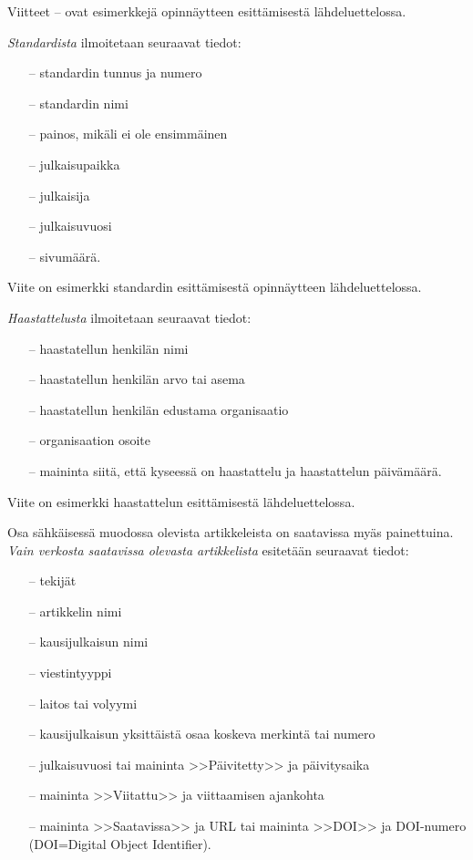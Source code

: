 \documentclass[english,12pt,a4paper,pdftex]{article}
\begin{document}
Viitteet \cite{Miinusmaa}--\cite{Lonnqvist} ovat esimerkkejä
opinnäytteen esittämisestä lähdeluettelossa.

\textit{Standardista} ilmoitetaan seuraavat tiedot:

\begin{itemize}
\item[--]standardin tunnus ja numero
\item[--]standardin nimi
\item[--]painos, mikäli ei ole ensimmäinen
\item[--]julkaisupaikka
\item[--]julkaisija
\item[--]julkaisuvuosi
\item[--]sivumäärä.
\end{itemize}
Viite \cite{sfs} on esimerkki standardin esittämisestä opinnäytteen
lähdeluettelossa.

\textit{Haastattelusta} ilmoitetaan seuraavat tiedot:

\begin{itemize}
\item[--]haastatellun henkilän nimi
\item[--]haastatellun henkilän arvo tai asema
\item[--]haastatellun henkilän edustama organisaatio
\item[--]organisaation osoite
\item[--]maininta siitä, että kyseessä on haastattelu ja haastattelun
päivämäärä.
\end{itemize}

Viite \cite{haastattelu} on esimerkki
haastattelun esittämisestä lähdeluettelossa.

Osa sähkäisessä muodossa olevista artikkeleista on saatavissa myäs
painettuina. \textit{Vain verkosta saatavissa olevasta artikkelista} esitetään
seuraavat tiedot:

\begin{itemize}
\item[--]tekijät
\item[--]artikkelin nimi
\item[--]kausijulkaisun nimi
\item[--]viestintyyppi
\item[--]laitos tai volyymi
\item[--]kausijulkaisun yksittäistä osaa koskeva merkintä tai numero
\item[--]julkaisuvuosi tai maininta >>Päivitetty>> ja päivitysaika
\item[--]maininta >>Viitattu>> ja viittaamisen ajankohta
\item[--]maininta >>Saatavissa>> ja URL tai
        maininta >>DOI>> ja DOI-numero (DOI=Digital Object Identifier).
\end{itemize}
\end{document}
